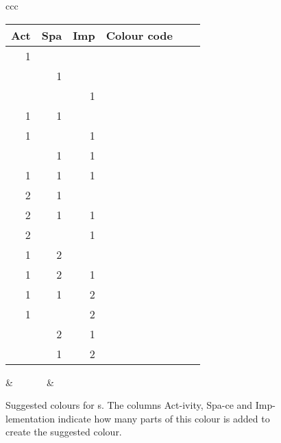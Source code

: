 \begin{figure}
  \centering
  \begin{tabular}{ccc}
    \begin{tabular}{rrrlpp}
      Act & Spa & Imp & Colour code\\
      \hline
      1 &   &   & \myboxt{ffff00}\\
        & 1 &   & \myboxt{ff00ff}\\
        &   & 1 & \myboxt{00ffff}\\
      \hline
      1 & 1 &   & \myboxt{ff8080}\\
      1 &   & 1 & \myboxt{80ff80}\\
        & 1 & 1 & \myboxt{8080ff}\\
      \hline
      1 & 1 & 1 & \myboxt{aaaaaa}\\
      \hline
      2 & 1 &   & \myboxt{ffaa55}\\
      2 & 1 & 1 & \myboxt{bfbf80}\\
      2 &   & 1 & \myboxt{aaff55}\\
      1 & 2 &   & \myboxt{ff55aa}\\
      1 & 2 & 1 & \myboxt{bf80bf}\\
      1 & 1 & 2 & \myboxt{80bfbf}\\
      1 &   & 2 & \myboxt{55ffaa}\\
        & 2 & 1 & \myboxt{aa55ff}\\
        & 1 & 2 & \myboxt{55aaff}\\
    \end{tabular}
    &~~~~~~~&
  \end{tabular}
  \caption{\label{tbl:graphics-colour-sugggestions}Suggested colours for s. The
    columns \textsf{Act}-ivity, \textsf{Spa}-ce and
    \textsf{Imp}-lementation indicate how many parts of this
    colour is added to create the suggested colour.}
\end{figure}